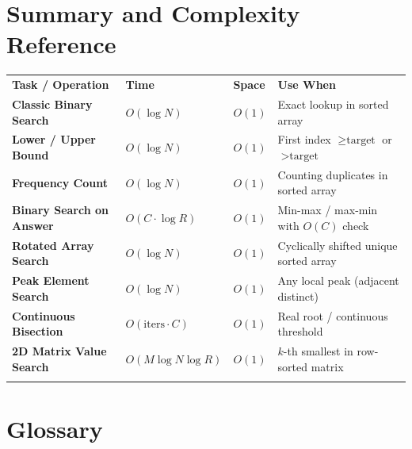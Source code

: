 \documentclass[11pt,a4paper]{article}
\theoremstyle{definition}
\begin{document}
\section{Summary and Complexity Reference}

\begingroup\small{}
\begin{tabularx}{\textwidth}{>{\raggedright\arraybackslash\bfseries}p{4.0cm} >{\centering\arraybackslash}p{2.6cm} >{\centering\arraybackslash}p{1.6cm} >{\raggedright\arraybackslash}X}
\arrayrulecolor{primaryblue}\toprule[1.2pt]
\rowcolor{primaryblue!10}
\textcolor{primaryblue}{\textbf{Task / Operation}} & \textcolor{primaryblue}{\textbf{Time}} & \textcolor{primaryblue}{\textbf{Space}} & \textcolor{primaryblue}{\textbf{Use When}} \\
\arrayrulecolor{codeframe}\midrule[0.6pt]
Classic Binary Search & $O(\log N)$ & $O(1)$ & Exact lookup in sorted array \\
Lower / Upper Bound & $O(\log N)$ & $O(1)$ & First index $\ge \text{target}$ or $> \text{target}$ \\
Frequency Count & $O(\log N)$ & $O(1)$ & Counting duplicates in sorted array \\
Binary Search on Answer & $O(C \cdot \log R)$ & $O(1)$ & Min-max / max-min with $O(C)$ check \\
Rotated Array Search & $O(\log N)$ & $O(1)$ & Cyclically shifted unique sorted array \\
Peak Element Search & $O(\log N)$ & $O(1)$ & Any local peak (adjacent distinct) \\
Continuous Bisection & $O(\text{iters} \cdot C)$ & $O(1)$ & Real root / continuous threshold \\
2D Matrix Value Search & $O(M \log N \log R)$ & $O(1)$ & $k$-th smallest in row-sorted matrix \\
\arrayrulecolor{primaryblue}\bottomrule[1.2pt]
\end{tabularx}\endgroup

\section{Glossary}
\end{document}

